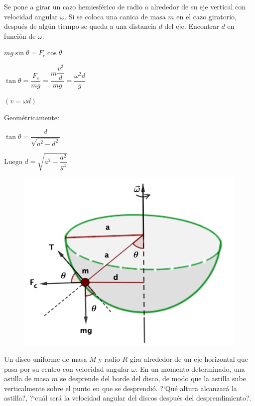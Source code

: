 \begin{prob}
Se pone a girar un cazo hemiesférico de radio $a$ alrededor de su eje vertical con velocidad angular $\omega$. Si se coloca una canica de masa $m$ en el cazo giratorio, después de algún tiempo se queda a una distancia $d$ del eje. Encontrar $d$ en función de $\omega$.	
\end{prob}
\begin{multicols}{2}
$mg\sin \theta=F_c \cos \theta$

$\tan \theta=\dfrac{F_c}{mg}=\dfrac{m\dfrac{v^2}{d}}{mg}=\dfrac{\omega^2 d}{g}$

\textcolor{gris}{$(v=\omega d)$}

Geométricamente: 

$\tan \theta=\dfrac{d}{\sqrt{a^2-d^2}}$

Luego $d=\sqrt{a^2-\dfrac{a^2}{g^4}}$
\begin{figure}[H]
	\centering
	\includegraphics[width=.55\textwidth]{imagenes/imagenes17/T17IM10.png}
	\end{figure}
\end{multicols}

\vspace{5mm} %
\begin{prob}
	Un disco uniforme de masa $M$ y radio $R$ gira alrededor de un eje horizontal que pasa por su centro con velocidad angular $\omega$. En un momento determinado, una astilla de masa $m$ se desprende del borde del disco, de modo que la astilla sube verticalmente sobre el punto en que se desprendió. ?`Qué altura alcanzará la astilla?, ?`cuál será la velocidad angular del discos después del desprendimiento?.
\end{prob}

